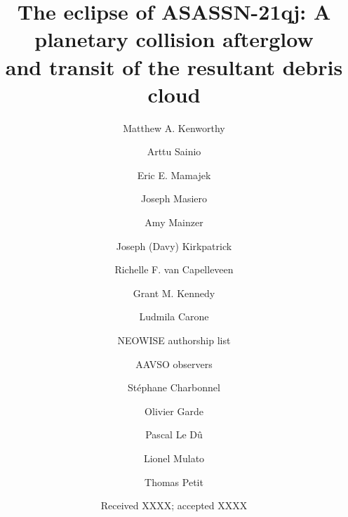 \documentclass{aa}
\begin{document}
 
   \title{The eclipse of ASASSN-21qj: A planetary collision afterglow\\ and transit of the resultant debris cloud}

   \author{Matthew A. Kenworthy
          \and
          Arttu Sainio
          \and
          Eric E. Mamajek
          \and
          Joseph Masiero
          \and
          Amy Mainzer
          \and
          Joseph (Davy) Kirkpatrick
          \and 
          Richelle F. van Capelleveen
          \and
          Grant M. Kennedy
          \and
          Ludmila Carone
          \and
          NEOWISE authorship list
          \and
          AAVSO observers
          \and
          St\'{e}phane Charbonnel
          \and
        Olivier Garde
        \and
        Pascal Le D\^{u}
        \and
        Lionel Mulato
        \and
        Thomas Petit
          }

   \date{Received XXXX; accepted XXXX}

 
\end{document}
